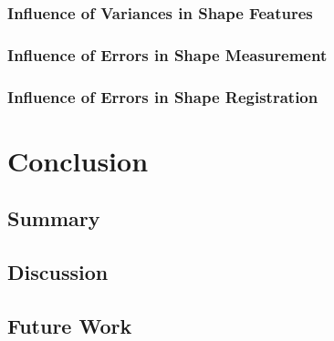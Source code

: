 \documentclass[pdftex,12pt,a4paper]{report}
\begin{document}
\subsection{Influence of Variances in Shape Features}

\subsection{Influence of Errors in Shape Measurement}

\subsection{Influence of Errors in Shape Registration}

\chapter{Conclusion}

\section{Summary}

\section{Discussion}

\section{Future Work}

\listoffigures

\listoftables

\end{document}
